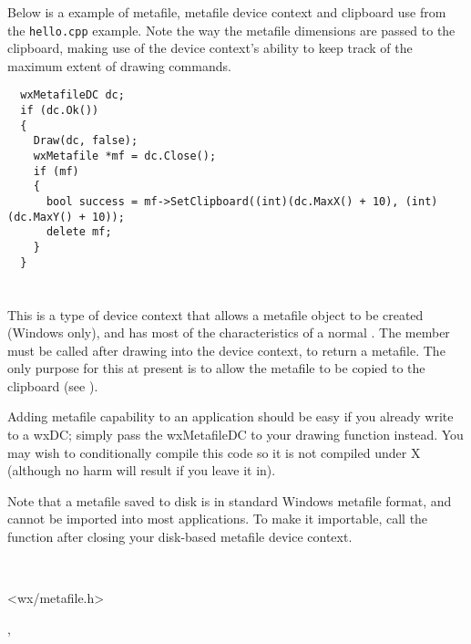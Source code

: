 Below is a example of metafile, metafile device context and clipboard use
from the {\tt hello.cpp} example. Note the way the metafile dimensions
are passed to the clipboard, making use of the device context's ability
to keep track of the maximum extent of drawing commands.

\begin{verbatim}
  wxMetafileDC dc;
  if (dc.Ok())
  {
    Draw(dc, false);
    wxMetafile *mf = dc.Close();
    if (mf)
    {
      bool success = mf->SetClipboard((int)(dc.MaxX() + 10), (int)(dc.MaxY() + 10));
      delete mf;
    }
  }
\end{verbatim}

\section{}\label{wxmetafiledc}

This is a type of device context that allows a metafile object to be
created (Windows only), and has most of the characteristics of a normal
. The  member must be called after drawing into the
device context, to return a metafile. The only purpose for this at
present is to allow the metafile to be copied to the clipboard (see ).

Adding metafile capability to an application should be easy if you
already write to a wxDC; simply pass the wxMetafileDC to your drawing
function instead. You may wish to conditionally compile this code so it
is not compiled under X (although no harm will result if you leave it
in).

Note that a metafile saved to disk is in standard Windows metafile format,
and cannot be imported into most applications. To make it importable,
call the function  after
closing your disk-based metafile device context.


\\


<wx/metafile.h>


, 


